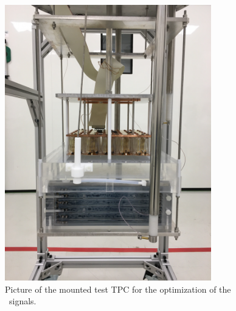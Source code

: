 \begin{figure}[!t]
\centering
\includegraphics[angle=-90,width=0.8\textwidth]{./Figures/proto0_mockup.jpeg}
\caption[Picture of the mounted test TPC for the optimization of the \STwo\ signals.]{Picture of the mounted test TPC for the optimization of the \STwo\ signals.}
\label{fig:proto0_mockup}
\end{figure}